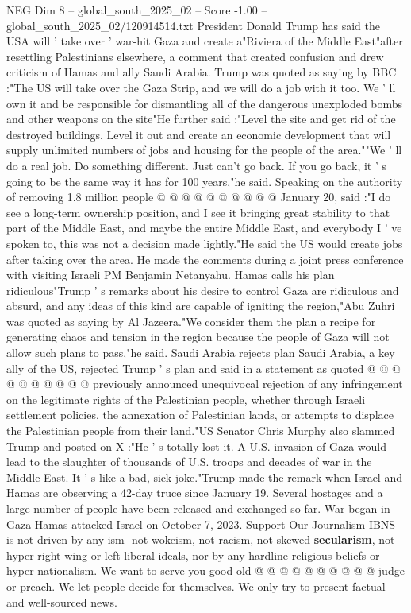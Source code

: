 \begin{textsample}{NEG Dim 8 – global\_south\_2025\_02 – Score -1.00 – global\_south\_2025\_02/120914514.txt}  \label{ex:f8_neg_067}
President Donald Trump has said the USA will ' take over ' war-hit Gaza and create a"Riviera of the Middle East"after resettling Palestinians elsewhere, a comment that created confusion and drew criticism of Hamas and ally Saudi Arabia.
Trump was quoted as saying by BBC :"The US will take over the Gaza Strip, and we will do a job with it too.
We ' ll own it and be responsible for dismantling all of the dangerous unexploded bombs and other weapons on the site"He further said :"Level the site and get rid of the destroyed buildings.
Level it out and create an economic development that will supply unlimited numbers of jobs and housing for the people of the area.""We ' ll do a real job.
Do something different.
Just can't go back.
If you go back, it ' s going to be the same way it has for 100 years,"he said.
Speaking on the authority of removing 1.8 million people @ @ @ @ @ @ @ @ @ @ January 20, said :"I do see a long-term ownership position, and I see it bringing great stability to that part of the Middle East, and maybe the entire Middle East, and everybody I ' ve spoken to, this was not a decision made lightly."He said the US would create jobs after taking over the area.
He made the comments during a joint press conference with visiting Israeli PM Benjamin Netanyahu.
Hamas calls his plan ridiculous"Trump ' s remarks about his desire to control Gaza are ridiculous and absurd, and any ideas of this kind are capable of igniting the region,"Abu Zuhri was quoted as saying by Al Jazeera."We consider them the plan a recipe for generating chaos and tension in the region because the people of Gaza will not allow such plans to pass,"he said.
Saudi Arabia rejects plan Saudi Arabia, a key ally of the US, rejected Trump ' s plan and said in a statement as quoted @ @ @ @ @ @ @ @ @ @ previously announced unequivocal rejection of any infringement on the legitimate rights of the Palestinian people, whether through Israeli settlement policies, the annexation of Palestinian lands, or attempts to displace the Palestinian people from their land."US Senator Chris Murphy also slammed Trump and posted on X :"He ' s totally lost it.
A U.S. invasion of Gaza would lead to the slaughter of thousands of U.S. troops and decades of war in the Middle East.
It ' s like a bad, sick joke."Trump made the remark when Israel and Hamas are observing a 42-day truce since January 19.
Several hostages and a large number of people have been released and exchanged so far.
War began in Gaza Hamas attacked Israel on October 7, 2023.
Support Our Journalism IBNS is not driven by any ism- not wokeism, not racism, not skewed \textbf{secularism}, not hyper right-wing or left liberal ideals, nor by any hardline religious beliefs or hyper nationalism.
We want to serve you good old @ @ @ @ @ @ @ @ @ @ judge or preach.
We let people decide for themselves.
We only try to present factual and well-sourced news.

\end{textsample}
